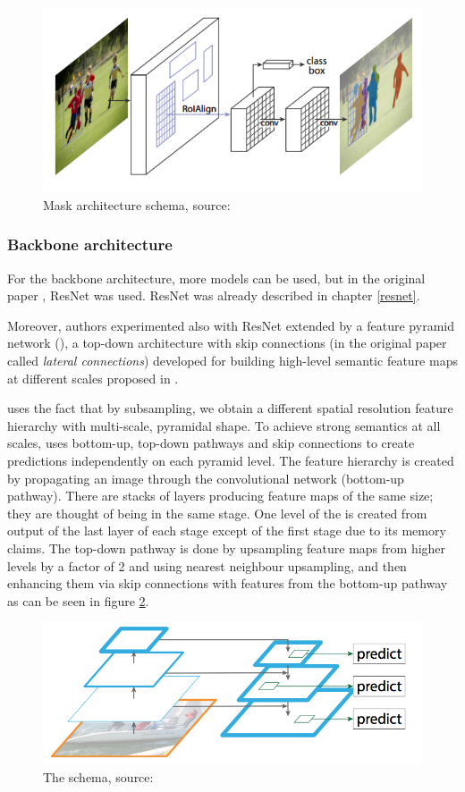 \begin{figure}[H]
   \centering
	\includegraphics[width=0.4\linewidth]{./pictures/maskrcnn.png}
	\caption[Mask R-CNN architecture]{Mask  architecture schema, source: \cite{mask-rcnn}}
      \label{fig:mask-rcnn}
\end{figure}

\subsubsection{Backbone architecture}
\label{backbone}

For the backbone architecture, more models can be used, but in the original paper \cite{mask-rcnn}, ResNet was used. ResNet was already described in chapter \ref{resnet}.

Moreover, authors experimented also with ResNet extended by a feature pyramid network (), a top-down architecture with skip connections (in the original paper called \textit{lateral connections}) developed for building high-level semantic feature maps at different scales proposed in \cite{fpn}.

 uses the fact that by subsampling, we obtain a different spatial resolution feature hierarchy with multi-scale, pyramidal shape. To achieve strong semantics at all scales,  uses bottom-up, top-down pathways and skip connections to create predictions independently on each pyramid level. The feature hierarchy is created by propagating an image through the convolutional network (bottom-up pathway). There are stacks of layers producing feature maps of the same size; they are thought of being in the same stage. One level of the  is created from output of the last layer of each stage except of the first stage due to its memory claims. The top-down pathway is done by upsampling feature maps from higher levels by a factor of 2 and using nearest neighbour upsampling, and then enhancing them via skip connections with features from the bottom-up pathway as can be seen in figure \ref{fig:fpn}.

\begin{figure}[H]
   \centering
	\includegraphics[width=0.4\linewidth]{./pictures/top-down.png}
	\caption[Feature pyramid network]{The  schema, source: \cite{fpn}}
      \label{fig:fpn}
\end{figure}

